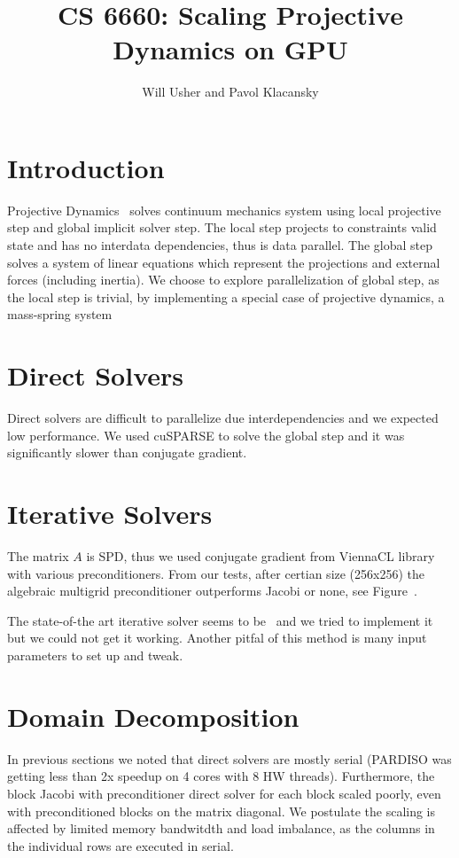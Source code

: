 \documentclass{article}
\title{CS 6660: Scaling Projective Dynamics on GPU}
\author{Will Usher and Pavol Klacansky}
\begin{document}
\maketitle

\section{Introduction}
Projective Dynamics~\cite{Bouaziz14} solves continuum mechanics system using
local projective step and global implicit solver step. The local step projects
to constraints valid state and has no interdata dependencies, thus is data
parallel. The global step solves a system of linear equations which represent
the projections and external forces (including inertia). We choose to explore
parallelization of global step, as the local step is trivial, by implementing
a special case of projective dynamics, a mass-spring system~\cite{Liu13}


\section{Direct Solvers}
Direct solvers are difficult to parallelize due interdependencies and we
expected low performance. We used cuSPARSE to solve the global step and it
was significantly slower than conjugate gradient.


\section{Iterative Solvers}
The matrix $A$ is SPD, thus we used conjugate gradient from ViennaCL library
with various preconditioners. From our tests, after certian size (256x256)
the algebraic multigrid preconditioner outperforms Jacobi or none,
see Figure~.

The state-of-the art iterative solver seems to be~\cite{Wang15} and we tried
to implement it but we could not get it working. Another pitfal of this method
is many input parameters to set up and tweak.


\section{Domain Decomposition}
In previous sections we noted that direct solvers are mostly serial (PARDISO
was getting less than 2x speedup on 4 cores with 8 HW threads). Furthermore,
the block Jacobi with preconditioner direct solver for each block scaled
poorly, even with preconditioned blocks on the matrix diagonal. We postulate
the scaling is affected by limited memory bandwitdth and load imbalance, as
the columns in the individual rows are executed in serial.
\end{document}
